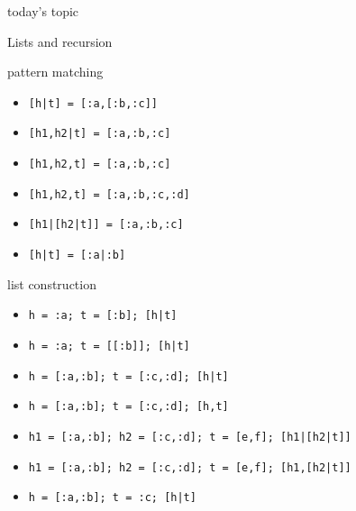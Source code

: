 \begin{frame}{today's topic}

\vspace{60pt}\hspace{80pt}Lists and recursion

\end{frame}

\begin{frame}{pattern matching}
\begin{itemize}
\pause \item  {\tt [h|t] = [:a,[:b,:c]]}  
\pause \item  {\tt [h1,h2|t] = [:a,:b,:c]} 
\pause \item  {\tt [h1,h2,t] = [:a,:b,:c]} 
\pause \item  {\tt [h1,h2,t] = [:a,:b,:c,:d]} 
\pause \item  {\tt [h1|[h2|t]] = [:a,:b,:c]}
\pause \item  {\tt [h|t] = [:a|:b]}
\end{itemize}
\end{frame}

\begin{frame}{list construction}
\begin{itemize}
\pause \item  {\tt h = :a; t = [:b]; [h|t]}
\pause \item  {\tt h = :a; t = [[:b]]; [h|t]}
\pause \item  {\tt h = [:a,:b]; t = [:c,:d]; [h|t]}
\pause \item  {\tt h = [:a,:b]; t = [:c,:d]; [h,t]}
\pause \item  {\tt h1 = [:a,:b]; h2 = [:c,:d]; t = [e,f]; [h1|[h2|t]]}
\pause \item  {\tt h1 = [:a,:b]; h2 = [:c,:d]; t = [e,f]; [h1,[h2|t]]}
\pause \item  {\tt h = [:a,:b]; t = :c; [h|t]}
\end{itemize}
\end{frame}


